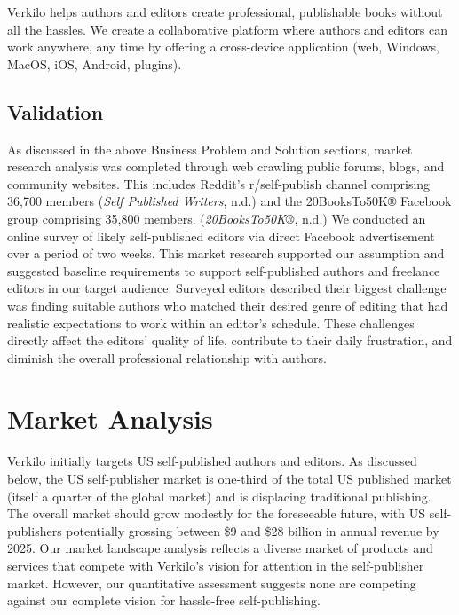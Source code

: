 \documentclass[10pt,openany]{book}
\begin{document}
Verkilo helps authors and editors create professional, publishable books
without all the hassles. We create a collaborative platform where
authors and editors can work anywhere, any time by offering a
cross-device application (web, Windows, MacOS, iOS, Android, plugins).

\newpage

\hypertarget{validation}{%
\section{Validation}\label{validation}}

As discussed in the above Business Problem and Solution sections, market
research analysis was completed through web crawling public forums,
blogs, and community websites. This includes Reddit's r/self-publish
channel comprising 36,700 members (\emph{Self Published Writers}, n.d.)
and the 20BooksTo50K® Facebook group comprising 35,800 members.
(\emph{20BooksTo50K®}, n.d.) We conducted an online survey of likely
self-published editors via direct Facebook advertisement over a period
of two weeks. This market research supported our assumption and
suggested baseline requirements to support self-published authors and
freelance editors in our target audience. Surveyed editors described
their biggest challenge was finding suitable authors who matched their
desired genre of editing that had realistic expectations to work within
an editor's schedule. These challenges directly affect the editors'
quality of life, contribute to their daily frustration, and diminish the
overall professional relationship with authors.

\hypertarget{market-analysis}{%
\chapter{Market Analysis}\label{market-analysis}}

Verkilo initially targets US self-published authors and editors. As
discussed below, the US self-publisher market is one-third of the total
US published market (itself a quarter of the global market) and is
displacing traditional publishing. The overall market should grow
modestly for the foreseeable future, with US self-publishers potentially
grossing between \$9 and \$28 billion in annual revenue by 2025. Our
market landscape analysis reflects a diverse market of products and
services that compete with Verkilo's vision for attention in the
self-publisher market. However, our quantitative assessment suggests
none are competing against our complete vision for hassle-free
self-publishing.
\end{document}
